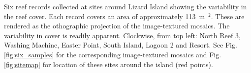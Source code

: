 \label{fig:reef_record_example_bathy} Six reef records collected at sites around Lizard Island showing the variability in the reef cover. Each record covers an area of approximately 113~m~$^2$. These are rendered as the othographic projection of the image-textured mosaics. The variability in cover is readily apparent. Clockwise, from top left: North Reef 3, Washing Machine, Easter Point, South Island, Lagoon 2 and Resort. See Fig. \ref{fig:six_samples} for the corresponding image-textured mosaics and Fig. \ref{fig:sitemap} for location of these sites around the island (red points).